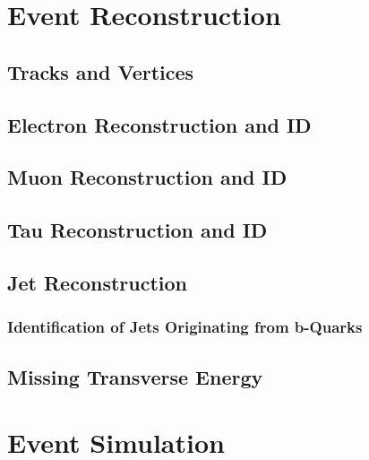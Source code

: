 \documentclass[oneside, letterpaper, 12pt, oldfontcommands]{memoir}
\begin{document}
\chapter{Event Reconstruction}
 \section{Tracks and Vertices}
 \section{Electron Reconstruction and ID}
 \section{Muon Reconstruction and ID}
 \section{Tau Reconstruction and ID}
 \section{Jet Reconstruction}
  \subsection{Identification of Jets Originating from b-Quarks}
 \section{Missing Transverse Energy}

\chapter{Event Simulation}


\end{document}
